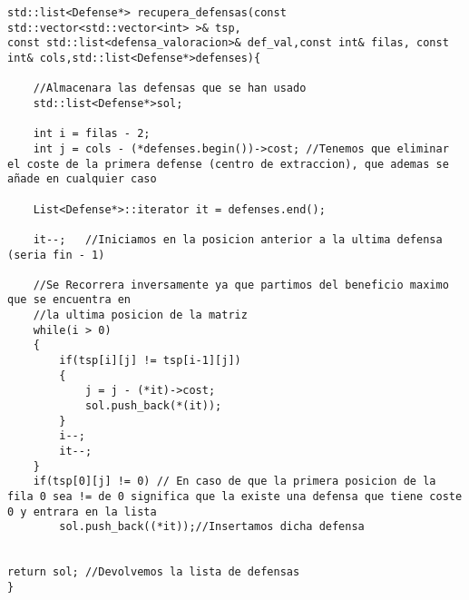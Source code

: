 \begin{lstlisting}
std::list<Defense*> recupera_defensas(const std::vector<std::vector<int> >& tsp,
const std::list<defensa_valoracion>& def_val,const int& filas, const int& cols,std::list<Defense*>defenses){

    //Almacenara las defensas que se han usado
    std::list<Defense*>sol;

    int i = filas - 2;
    int j = cols - (*defenses.begin())->cost; //Tenemos que eliminar el coste de la primera defense (centro de extraccion), que ademas se añade en cualquier caso

    List<Defense*>::iterator it = defenses.end();

    it--;   //Iniciamos en la posicion anterior a la ultima defensa (seria fin - 1)
    
    //Se Recorrera inversamente ya que partimos del beneficio maximo que se encuentra en 
    //la ultima posicion de la matriz
    while(i > 0)
    {
        if(tsp[i][j] != tsp[i-1][j])
        {
            j = j - (*it)->cost;
            sol.push_back(*(it));
        }
        i--;
        it--;
    }
    if(tsp[0][j] != 0) // En caso de que la primera posicion de la fila 0 sea != de 0 significa que la existe una defensa que tiene coste 0 y entrara en la lista
        sol.push_back((*it));//Insertamos dicha defensa

    
return sol; //Devolvemos la lista de defensas
}
\end{lstlisting}